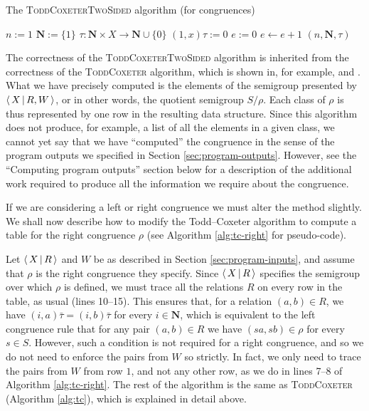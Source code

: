 \begin{algorithm}
\caption{The \textsc{ToddCoxeterTwoSided} algorithm (for congruences)}
\label{alg:tc-twosided}
\begin{algorithmic}[1]
\State $n := 1$
\State $\mathbf{N} := \{1\}$
\State $\tau : \mathbf{N} \times X \to \mathbf{N} \cup \{0\}$
  \State $(1, x)\tau := 0$
\EndFor
\State $e := 0$
\Repeat
  \State $e \gets e + 1$
      \State {}
    \EndFor
      \State {}
    \EndFor
  \EndIf
{}  
\State \Return $(n, \mathbf{N}, \tau)$
\EndProcedure
\end{algorithmic}
\end{algorithm}

The correctness of the \textsc{ToddCoxeterTwoSided} algorithm is inherited from
the correctness of the \textsc{ToddCoxeter} algorithm, which is shown in, for
example, \cite{todd_coxeter_1936} and \cite{beetham_campbell_1976}.  What we
have precisely computed is the elements of the semigroup presented by
$\left\langle \, X \, \middle| \, R,W \, \right\rangle$, or in other words, the quotient semigroup $S / \rho$.  Each
class of $\rho$ is thus represented by one row in the resulting data structure.
Since this algorithm does not produce, for example, a list of all the elements
in a given class, we cannot yet say that we have ``computed'' the congruence in
the sense of the program outputs we specified in Section
\ref{sec:program-outputs}.  However, see the ``Computing program outputs''
section below for a description of the additional work required to produce all
the information we require about the congruence.

If we are considering a left or right congruence we
must alter the method slightly.  We shall now describe how to modify
the Todd--Coxeter algorithm to compute a table for the right congruence $\rho$ (see Algorithm
\ref{alg:tc-right} for pseudo-code).

Let $\left\langle \, X \, \middle| \, R \, \right\rangle$ and $W$ be as described in Section \ref{sec:program-inputs}, and
assume that $\rho$ is the right congruence they specify.  Since
$\left\langle \, X \, \middle| \, R \, \right\rangle$ specifies the semigroup over which $\rho$ is defined, we must trace
all the relations $R$ on every row in the table, as usual (lines 10--15).  This ensures that,
for a relation $(a,b) \in R$, we have $(i, a)\bar\tau = (i, b)\bar\tau$ for
every $i \in \mathbf{N}$, which is equivalent to the left congruence rule that
for any pair $(a,b) \in R$ we have $(sa, sb) \in \rho$ for every $s \in S$.
However, such a condition is not required for a right congruence, and so we do
not need to enforce the pairs from $W$ so strictly.  In fact, we only need to
trace the pairs from $W$ from row $1$, and not any other row, as we do in lines 7--8
of Algorithm \ref{alg:tc-right}.
The rest of the algorithm is the same as \textsc{ToddCoxeter} (Algorithm
\ref{alg:tc}), which is explained in detail above.

